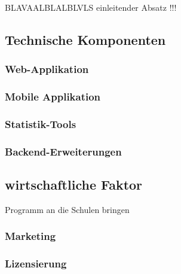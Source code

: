 BLAVAALBLALBLVLS
einleitender Absatz
!!!

\subsection{Technische Komponenten}

\subsubsection{Web-Applikation}

\subsubsection{Mobile Applikation}

\subsubsection{Statistik-Tools}

\subsubsection{Backend-Erweiterungen}


\subsection{wirtschaftliche Faktor}
Programm an die Schulen bringen

\subsubsection{Marketing}

\subsubsection{Lizensierung}